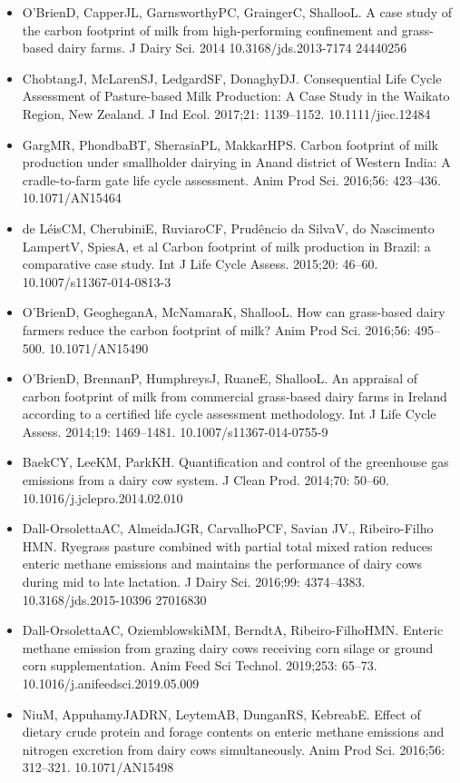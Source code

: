 \documentclass[11pt,a4paper]{article}
\begin{document}
\begin{itemize}
\item O’BrienD, CapperJL, GarnsworthyPC, GraingerC, ShallooL. A case study of the carbon footprint of milk from high-performing confinement and grass-based dairy farms. J Dairy Sci. 2014 10.3168/jds.2013-7174 24440256
\item ChobtangJ, McLarenSJ, LedgardSF, DonaghyDJ. Consequential Life Cycle Assessment of Pasture-based Milk Production: A Case Study in the Waikato Region, New Zealand. J Ind Ecol. 2017;21: 1139–1152. 10.1111/jiec.12484
\item GargMR, PhondbaBT, SherasiaPL, MakkarHPS. Carbon footprint of milk production under smallholder dairying in Anand district of Western India: A cradle-to-farm gate life cycle assessment. Anim Prod Sci. 2016;56: 423–436. 10.1071/AN15464
\item de LéisCM, CherubiniE, RuviaroCF, Prudêncio da SilvaV, do Nascimento LampertV, SpiesA, et al Carbon footprint of milk production in Brazil: a comparative case study. Int J Life Cycle Assess. 2015;20: 46–60. 10.1007/s11367-014-0813-3
\item O’BrienD, GeogheganA, McNamaraK, ShallooL. How can grass-based dairy farmers reduce the carbon footprint of milk? Anim Prod Sci. 2016;56: 495–500. 10.1071/AN15490
\item O’BrienD, BrennanP, HumphreysJ, RuaneE, ShallooL. An appraisal of carbon footprint of milk from commercial grass-based dairy farms in Ireland according to a certified life cycle assessment methodology. Int J Life Cycle Assess. 2014;19: 1469–1481. 10.1007/s11367-014-0755-9
\item BaekCY, LeeKM, ParkKH. Quantification and control of the greenhouse gas emissions from a dairy cow system. J Clean Prod. 2014;70: 50–60. 10.1016/j.jclepro.2014.02.010
\item Dall-OrsolettaAC, AlmeidaJGR, CarvalhoPCF, Savian JV., Ribeiro-Filho HMN. Ryegrass pasture combined with partial total mixed ration reduces enteric methane emissions and maintains the performance of dairy cows during mid to late lactation. J Dairy Sci. 2016;99: 4374–4383. 10.3168/jds.2015-10396 27016830
\item Dall-OrsolettaAC, OziemblowskiMM, BerndtA, Ribeiro-FilhoHMN. Enteric methane emission from grazing dairy cows receiving corn silage or ground corn supplementation. Anim Feed Sci Technol. 2019;253: 65–73. 10.1016/j.anifeedsci.2019.05.009
\item NiuM, AppuhamyJADRN, LeytemAB, DunganRS, KebreabE. Effect of dietary crude protein and forage contents on enteric methane emissions and nitrogen excretion from dairy cows simultaneously. Anim Prod Sci. 2016;56: 312–321. 10.1071/AN15498

\end{itemize}
\end{document}
